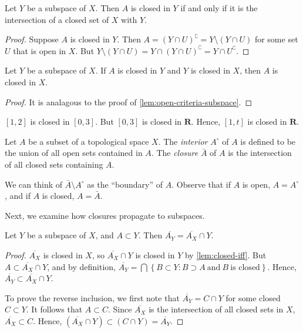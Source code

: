 \begin{lemma}
\label{lem:closed-iff}
Let $Y$ be a subspace of $X$. Then $A$ is closed in $Y$ if and only if
it is the intersection of a closed set of $X$ with $Y$.
\end{lemma}
\begin{proof}
Suppose $A$ is closed in $Y$. Then $A = (Y \cap U)^{\complement} = Y \setminus
(Y \cap U)$ for some set $U$ that is open in $X$.
But $Y \setminus (Y \cap U) = Y \cap (Y \cap U)^{\complement} = Y \cap
U^{\complement}$.
\end{proof}
\begin{lemma}
Let $Y$ be a subspace of $X$. If $A$ is closed in $Y$ and $Y$ is closed in
$X$, then $A$ is closed in $X$.
\end{lemma}
\begin{proof}
It is analagous to the proof of \cref{lem:open-criteria-subspace}.
\end{proof}
\begin{example}
$[1,2]$ is closed in $[0,3]$. But
$[0,3]$ is closed in $\mathbf{R}$. Hence,
$[1,t]$ is closed in $\mathbf{R}$.
\end{example}
\begin{definition}
\label{def:interior}
Let $A$ be a subset of a topological space $X$. The \emph{interior}
$A^{\circ}$ of
$A$ is defined to be the union of all open sets contained in $A$.
The \emph{closure} $\bar{A}$ of $A$ is the intersection of all closed
sets containing $A$.
\end{definition}
\begin{remark}
\label{rem:intuition-closure}
We can think of $\bar{A} \setminus A^{\circ}$ as the ``boundary''
of $A$. Observe that if $A$ is open, $A = A^{\circ}$, and if $A$ is closed,
$A = \bar{A}$.
\end{remark}
Next, we examine how closures propagate to subspaces.
\begin{theorem}
\label{thm:closure-prop}
Let $Y$ be a subspace of $X$, and $A \subset Y$. Then
$\overline{A_{Y}} = \overline{A_{X}} \cap Y$.
\end{theorem}
\begin{proof}
$\overline{A_{X}}$ is closed in $X$, so $\overline{A_{X}} \cap Y$ is closed in $Y$
by \cref{lem:closed-iff}. But $A \subset \overline{A_{X}} \cap Y$, and by
definition, $\overline{A_{Y}} = \bigcap\left\{ B \subset Y: B \supset A \
\text{and} \
B \ \text{is closed}\right\}$. Hence, $\overline{A_{Y}} \subset
\overline{A_{X}} \cap Y$.
\par
To prove the reverse inclusion, we first note that
$\overline{A_{Y}} = C \cap Y$ for some closed $C \subset Y$.
It follows that $A \subset C$. Since $\overline{A_{X}}$ is the intersection of
all closed sets in $X$, $\overline{A_{X}} \subset C$. Hence,
$(\overline{A_{X}}\cap Y) \subset (C \cap Y) = \overline{A_{Y}}$.
\end{proof}
